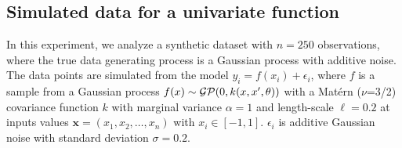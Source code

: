 \subsection{Simulated data for a univariate function}\label{sec_univariate_simu}

In this experiment, we analyze a synthetic dataset with $n = 250$ observations, where the true data generating process is a Gaussian process with additive noise. The data points are simulated from the model $y_i = f(x_i) + \epsilon_i$, where $f$ is a sample from a Gaussian process $f(x) \sim \operatorname{\mathcal{GP}}(0, k(x, x', \theta))$ with a Mat{\'e}rn ($\nu$=3/2) covariance function $k$ with marginal variance $\alpha=1$ and length-scale $\ell=0.2$ at inputs values $\bm{x}=(x_1,x_2,\dots,x_n)$ with $x_i \in [-1,1]$. $\epsilon_i$ is additive Gaussian noise with standard deviation $\sigma=0.2$. %
%
% 

